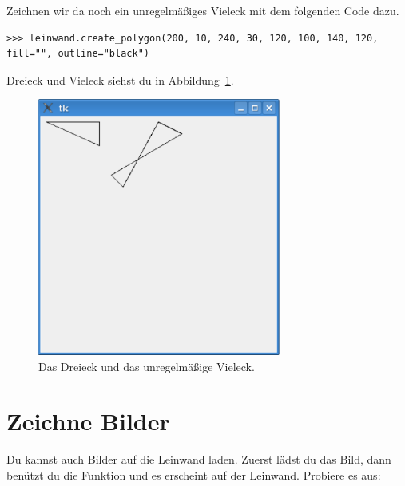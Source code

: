 Zeichnen wir da noch ein unregelmäßiges Vieleck mit dem folgenden Code dazu.

\begin{Verbatim}[frame=single]
>>> leinwand.create_polygon(200, 10, 240, 30, 120, 100, 140, 120, fill="", outline="black")
\end{Verbatim}

Dreieck und Vieleck siehst du in Abbildung~\ref{fig42}.

\begin{figure}
\begin{center}
\includegraphics[width=80mm]{images/figure42}
\end{center}
\caption{Das Dreieck und das unregelmäßige Vieleck.}\label{fig42}
\end{figure}

\section{Zeichne Bilder}
Du kannst auch Bilder auf die Leinwand laden. Zuerst lädst du das Bild, dann benützt du die Funktion  und es erscheint auf der Leinwand. Probiere es aus:

